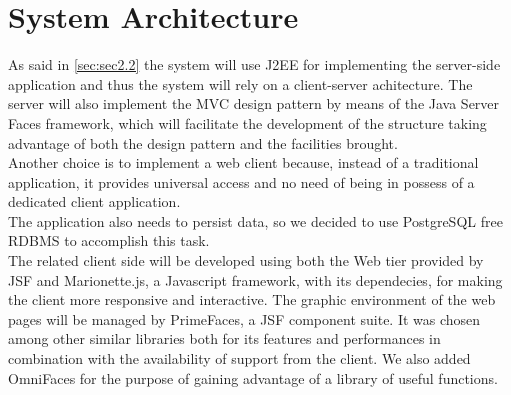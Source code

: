 \section{System Architecture} \label{sec:sec2.3}
As said in \autoref{sec:sec2.2} the system will use J2EE for implementing the server-side application and thus the system will rely on a client-server achitecture. The server will also implement the MVC design pattern by means of the Java Server Faces framework, which will facilitate the development of the structure taking advantage of both the design pattern and the facilities brought.\\
Another choice is to implement a web client because, instead of a traditional application, it provides universal access and no need of being in possess of a dedicated client application.\\
The application also needs to persist data, so we decided to use PostgreSQL free RDBMS to accomplish this task.\\
The related client side will be developed using both the Web tier provided by JSF and Marionette.js, a Javascript framework, with its dependecies, for making the client more responsive and interactive.
The graphic environment of the web pages will be managed by PrimeFaces, a JSF component suite. It was chosen among other similar libraries both for its features and performances in combination with the availability of support from the client. We also added OmniFaces for the purpose of gaining advantage of a library of useful functions.